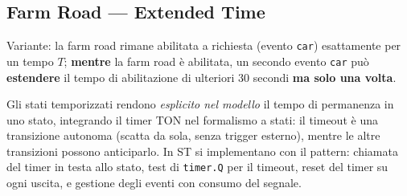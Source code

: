 \subsection{Farm Road — Extended Time}
Variante: la farm road rimane abilitata a richiesta (evento \texttt{car}) esattamente per un tempo $T$; \textbf{mentre} la farm road è abilitata, un secondo evento \texttt{car} può \textbf{estendere} il tempo di abilitazione di ulteriori 30 secondi \textbf{ma solo una volta}.

\begin{intuition}
Gli stati temporizzati rendono \emph{esplicito nel modello} il tempo di permanenza in uno stato, integrando il timer TON nel formalismo a stati: il timeout è una transizione autonoma (scatta da sola, senza trigger esterno), mentre le altre transizioni possono anticiparlo. In ST si implementano con il pattern: chiamata del timer in testa allo stato, test di \texttt{timer.Q} per il timeout, reset del timer su ogni uscita, e gestione degli eventi con consumo del segnale.
\end{intuition}
